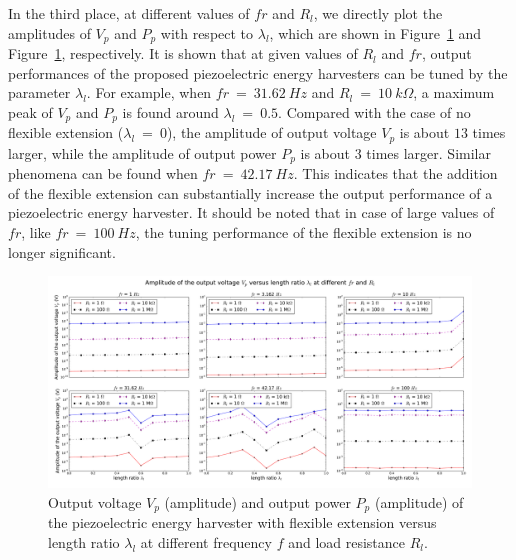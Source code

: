 \documentclass{elsarticle}
\begin{document}
In the third place, at different values of $fr$ and $R_l$, we directly plot the amplitudes of $V_p$ and $P_p$ with respect to $\lambda_l$, which are shown in Figure~\ref{fig:fig_vol_fr_sl_Rl_sl_vs_laml} and Figure~\ref{fig:fig_vol_fr_sl_Rl_sl_vs_laml}, respectively. It is shown that at given values of $R_l$ and $fr$, output performances of the proposed piezoelectric energy harvesters can be tuned by the parameter $\lambda_l$. For example, when $fr\ =\ 31.62\ Hz$ and $R_l\ =\ 10\ k\Omega$, a maximum peak of $V_p$ and $P_p$ is found around $\lambda_l\ =\ 0.5$. Compared with the case of no flexible extension ($\lambda_l\ =\ 0$), the amplitude of output voltage $V_p$ is about $13$ times larger, while the amplitude of output power $P_p$ is about $3$ times larger. Similar phenomena can be found when $fr\ =\ 42.17\ Hz$. This indicates that the addition of the flexible extension can substantially increase the output performance of a piezoelectric energy harvester. It should be noted that in case of large values of $fr$, like $fr\ =\ 100\ Hz$, the tuning performance of the flexible extension is no longer significant.


\begin{figure}[!htbp]
    \centering
    \includegraphics[width=\textwidth]{./fig_vol_fr_sl_Rl_sl_vs_laml}
    \caption{Output voltage $V_p$ (amplitude) and output power $P_p$ (amplitude) of the piezoelectric energy harvester with flexible extension versus length ratio $\lambda_l$ at different frequency $f$ and load resistance $R_l$. \color{red}{to be revised in the legend, add label (a), (b)}}
    \label{fig:fig_vol_fr_sl_Rl_sl_vs_laml}
\end{figure}
\end{document}
